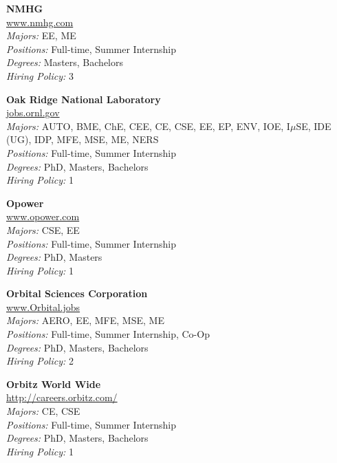 \documentclass{article}
\begin{document}
\begin{center}
\begin{multicols}{3}
\begin{minipage}{.9\columnwidth}{\Large\bf NMHG }\\
	\url{www.nmhg.com}\\
	\emph{Majors:} EE, ME\\
	\emph{Positions:} Full-time, Summer Internship\\
	\emph{Degrees:} Masters, Bachelors\\
	\emph{Hiring Policy:} 3\\
\end{minipage}
 
\begin{minipage}{.9\columnwidth}{\Large\bf Oak Ridge National Laboratory }\\
	\url{jobs.ornl.gov}\\
	\emph{Majors:} AUTO, BME, ChE, CEE, CE, CSE, EE, EP, ENV, IOE, I$\mu$SE, IDE (UG), IDP, MFE, MSE, ME, NERS\\
	\emph{Positions:} Full-time, Summer Internship\\
	\emph{Degrees:} PhD, Masters, Bachelors\\
	\emph{Hiring Policy:} 1\\
\end{minipage}
 
\begin{minipage}{.9\columnwidth}{\Large\bf Opower }\\
	\url{www.opower.com}\\
	\emph{Majors:} CSE, EE\\
	\emph{Positions:} Full-time, Summer Internship\\
	\emph{Degrees:} PhD, Masters\\
	\emph{Hiring Policy:} 1\\
\end{minipage}
 
\begin{minipage}{.9\columnwidth}{\Large\bf Orbital Sciences Corporation }\\
	\url{www.Orbital.jobs}\\
	\emph{Majors:} AERO, EE, MFE, MSE, ME\\
	\emph{Positions:} Full-time, Summer Internship, Co-Op\\
	\emph{Degrees:} PhD, Masters, Bachelors\\
	\emph{Hiring Policy:} 2\\
\end{minipage}
 
\begin{minipage}{.9\columnwidth}{\Large\bf Orbitz World Wide }\\
	\url{http://careers.orbitz.com/}\\
	\emph{Majors:} CE, CSE\\
	\emph{Positions:} Full-time, Summer Internship\\
	\emph{Degrees:} PhD, Masters, Bachelors\\
	\emph{Hiring Policy:} 1\\
\end{minipage}
 

\end{multicols}
\end{center}
\end{document}
